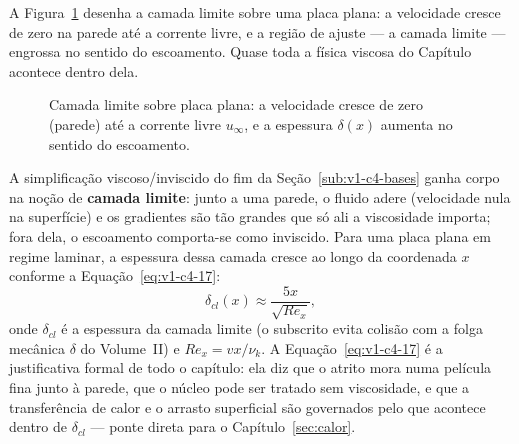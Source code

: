 \documentclass[12pt,a4paper]{article}
\numberwithin{equation}{section}
\numberwithin{table}{section}
\numberwithin{figure}{section}
\begin{document}
A Figura~\ref{fig:v1-c4-3} desenha a camada limite sobre uma placa plana: a
velocidade cresce de zero na parede até a corrente livre, e a região de
ajuste --- a camada limite --- engrossa no sentido do escoamento. Quase toda
a física viscosa do Capítulo acontece dentro dela.

\begin{figure}[H]
\centering
{}
\caption[Camada limite sobre placa plana com perfis de velocidade.]{%
Camada limite sobre placa plana: a velocidade cresce de zero (parede) até a
corrente livre $u_\infty$, e a espessura $\delta(x)$ aumenta no sentido do
escoamento.}
\label{fig:v1-c4-3}
\end{figure}


A simplificação viscoso/inviscido do fim da
Seção~\ref{sub:v1-c4-bases} ganha corpo na noção de \textbf{camada limite}:
junto a uma parede, o fluido adere (velocidade nula na superfície) e os
gradientes são tão grandes que só ali a viscosidade importa; fora dela, o
escoamento comporta-se como inviscido. Para uma placa plana em regime
laminar, a espessura dessa camada cresce ao longo da coordenada $x$ conforme
a Equação~\eqref{eq:v1-c4-17}:
\begin{equation}\label{eq:v1-c4-17}
\delta_{cl}(x) \approx \frac{5x}{\sqrt{Re_x}},
\end{equation}
onde $\delta_{cl}$ é a espessura da camada limite (o subscrito evita colisão
com a folga mecânica $\delta$ do Volume~II) e $Re_x = vx/\nu_k$. A
Equação~\eqref{eq:v1-c4-17} é a justificativa formal de todo o capítulo: ela
diz que o atrito mora numa película fina junto à parede, que o núcleo pode
ser tratado sem viscosidade, e que a transferência de calor e o arrasto
superficial são governados pelo que acontece dentro de $\delta_{cl}$ ---
ponte direta para o Capítulo~\ref{sec:calor}.
\end{document}
